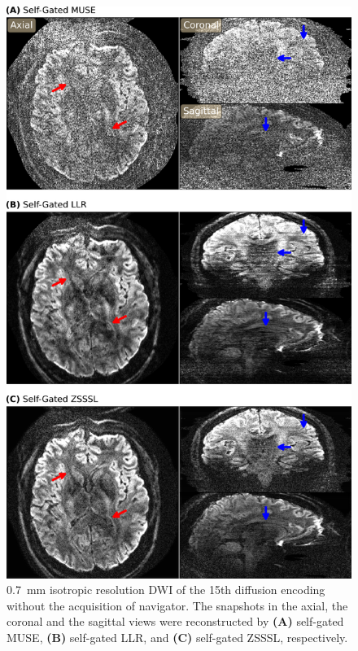 \documentclass[journal,twoside,web]{ieeecolor}
\begin{document}
	\begin{figure}
		\centering
		\includegraphics[width=\columnwidth]{../figures/fig7.png}
		\caption{\SI{0.7}{\milli\meter} isotropic resolution DWI
			of the 15th diffusion encoding 
			without the acquisition of navigator.
			The snapshots in the axial, the coronal and the sagittal views
			were reconstructed by \textbf{(A)} self-gated MUSE,
			\textbf{(B)} self-gated LLR, and
			\textbf{(C)} self-gated ZSSSL, respectively.}
		\label{FIG:MOTION_PROS}
	\end{figure}
\end{document}
